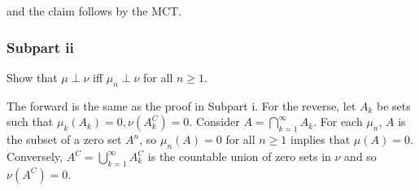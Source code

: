 \documentclass{article}
\begin{document}
and the claim follows by the MCT.

\subsubsection*{Subpart ii}

Show that $\mu \perp \nu$ iff $\mu_n \perp \nu$ for all $n \geq 1$.

The forward is the same as the proof in Subpart i. For the reverse, let $A_k$ be sets such that $\mu_k(A_k) = 0, \nu(A_k^C) = 0$. Consider $A = \bigcap_{k=1}^\infty A_k$. For each $\mu_n$, $A$ is the subset of a zero set $A^n$, so $\mu_n(A) = 0$ for all $n \geq 1$ implies that $\mu(A) = 0$. Conversely, $A^C = \bigcup_{k=1}^\infty A_k^C$ is the countable union of zero sets in $\nu$ and so $\nu(A^C) = 0$.
\end{document}
